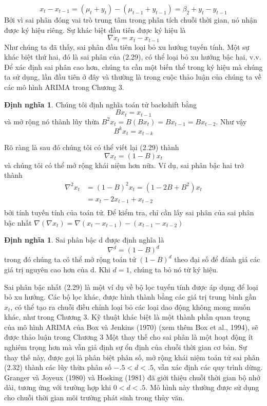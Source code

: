 \documentclass[12pt, a4paper,oneside]{book}
\theoremstyle{definition}
\newtheorem{dn}[theo]{Định nghĩa}
\begin{document}
$$	x_{t}-x_{t-1}= (\mu_{t}+y_{t})- (\mu_{t-1}+y_{t-1})= \beta_{2} + y_{t}- y_{t-1}$$
Bởi vì sai phân đóng vai trò trung tâm trong phân tích chuỗi thời gian, nó nhận được ký hiệu riêng. Sự khác biệt đầu tiên được ký hiệu là
$$\nabla x_{t}=x_{t}-x_{t-1}$$
Như chúng ta đã thấy, sai phân đầu tiên loại bỏ xu hướng tuyến tính. Một sự khác biệt thứ hai, đó là sai phân của (2.29), có thể loại bỏ xu hướng bậc hai, v.v. Để xác định sai phân cao hơn, chúng ta cần một biến thể trong ký hiệu mà chúng ta sử dụng, lần đầu tiên ở đây và thường là trong cuộc thảo luận của chúng ta về các mô hình ARIMA trong Chương 3.
\begin{dn}
	Chúng tôi định nghĩa toán tử backshift bằng
	$$Bx_{t}=x_{t-1}$$
	và mở rộng nó thành lũy thừa 	$B^{2}x_{t}=B(Bx_{t})=Bx_{t-1}=Bx_{t-2}$. Như vậy
	$$B^{k}x_{t}=x_{t-k}$$
\end{dn}
Rõ ràng là sau đó chúng tôi có thể viết lại (2.29) thành
$$\nabla x_{t}=(1-B)x_{t}$$
và chúng tôi có thể mở rộng khái niệm hơn nữa. Ví dụ, sai phân bậc hai trở thành
\begin{align*}
\nabla^{2} x_{t} &=(1-B)^{2}x_{t}=(1-2B+B^{2})x_{t}\\
&=x_{t}-2x_{t-1}+x_{t-2}\\	
\end{align*}
bởi tính tuyến tính của toán tử. Để kiểm tra, chỉ cần lấy sai phân của sai phân bậc nhất
$\nabla(\nabla x_{t})=\nabla (x_{t}-x_{t-1})- (x_{t-1}-x_{t-2})$
\begin{dn}
	Sai phân bậc d được định nghĩa là
	$$\nabla^{d}=(1-B)^{d}$$
	trong đó chúng ta có thể mở rộng toán tử $ (1-B)^{d} $ theo đại số để đánh giá các giá trị nguyên cao hơn của d. Khi $ d = 1 $, chúng ta bỏ nó từ ký hiệu.
\end{dn}
Sai phân bậc nhất (2.29) là một ví dụ về bộ lọc tuyến tính được áp dụng để loại bỏ xu hướng. Các bộ lọc khác, được hình thành bằng các giá trị trung bình gần $ x_{t} $, có thể tạo ra chuỗi điều chỉnh loại bỏ các loại dao động không mong muốn khác, như trong Chương 3. Kỹ thuật khác biệt là một thành phần quan trọng của mô hình ARIMA của Box và Jenkins (1970) (xem thêm Box et al., 1994), sẽ được thảo luận trong Chương 3
Một thay thế cho sai phân là một hoạt động ít nghiêm trọng hơn mà vẫn giả định sự ổn định của chuỗi thời gian cơ bản. Sự thay thế này, được gọi là phân biệt phân số, mở rộng khái niệm toán tử sai phân (2.32) thành các lũy thừa phân số $ −.5 <d <.5 $, vẫn xác định các quy trình dừng. Granger và Joyeux (1980) và Hosking (1981) đã giới thiệu chuỗi thời gian bộ nhớ dài, tương ứng với trường hợp khi $ 0 <d <.5 $. Mô hình này thường được sử dụng cho chuỗi thời gian môi trường phát sinh trong thủy văn.
\end{document}
